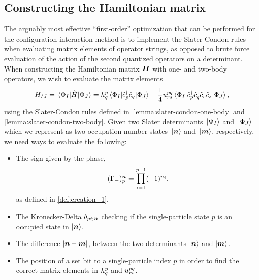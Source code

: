         \subsection{Constructing the Hamiltonian matrix}
            The arguably most effective ``first-order'' optimization that can be
            performed for the configuration interaction method is to implement
            the Slater-Condon rules when evaluating matrix elements of operator
            strings, as opposed to brute force evaluation of the action of the
            second quantized operators on a determinant.
            When constructing the Hamiltonian matrix $\boldsymbol{H}$ with one- and
            two-body operators, we wish to evaluate the matrix elements
            \begin{align}
                H_{IJ}
                = \mel*{\Phi_{I}}{\hat{H}}{\Phi_J}
                =
                h^{p}_{q}
                \mel*{\Phi_{I}}{\hat{c}_{p}^{\dagger}\hat{c}_{q}}{\Phi_J}
                +
                \frac{1}{4}
                u^{pq}_{rs}
                \mel*{\Phi_{I}}{
                    \hat{c}_{p}^{\dagger}
                    \hat{c}_{q}^{\dagger}
                    \hat{c}_{r}
                    \hat{c}_{s}
                }{\Phi_J},
            \end{align}
            using the Slater-Condon rules defined in
            \autoref{lemma:slater-condon-one-body} and
            \autoref{lemma:slater-condon-two-body}.
            Given two Slater determinants $\ket*{\Phi_I}$ and $\ket*{\Phi_J}$
            which we represent as two occupation number states $\ket*{\boldsymbol{n}}$
            and $\ket*{\boldsymbol{m}}$, respectively, we need ways to evaluate the
            following:
            \begin{itemize}
                \item The sign given by the phase,
                    \begin{align}
                        (\Gamma_{-})^{\boldsymbol{n}}_{p}
                        = \prod_{i = 1}^{p - 1}(-1)^{n_i},
                    \end{align}
                    as defined in \autoref{def:creation_1}.
                \item The Kronecker-Delta $\delta_{p \in \boldsymbol{n}}$ checking if
                    the single-particle state $p$ is an occupied state in
                    $\ket{\boldsymbol{n}}$.
                \item The difference $\abs{\boldsymbol{n} - \boldsymbol{m}}$, between the two
                    determinants $\ket{\boldsymbol{n}}$ and $\ket{\boldsymbol{m}}$.
                \item The position of a set bit to a single-particle index $p$
                    in order to find the correct matrix elements in
                    $h^{p}_{q}$ and $u^{pq}_{rs}$.
            \end{itemize}

